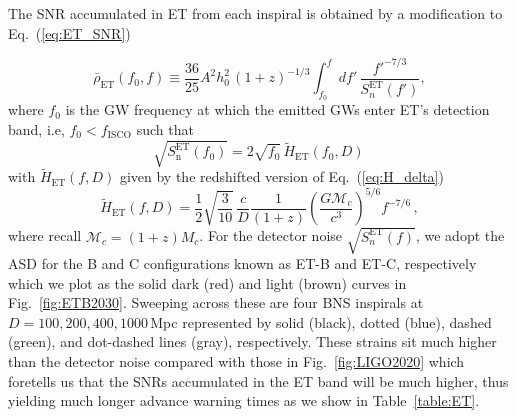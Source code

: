 \documentclass[amsmath,amssymb,aps,floats,amsfonts,notitlepage,superscriptaddress,eqsecnum,nofootinbib,10pt]{revtex4-1}
\newcommand{\f}{\frac}
\newcommand{\be}{\begin{equation}}
\newcommand{\ee}{\end{equation}}
\begin{document}
The SNR accumulated in ET from each inspiral is obtained by a modification to Eq.~(\ref{eq:ET_SNR})

%
\be
\bar\rho_{\text{ET}}(f_0,f)\equiv \f{36}{25}A^2 h_0^2\, (1+z)^{-1/3}\int_{f_0}^{f} d f'\, \f{f'^{-7/3}}{S^\text{ET}_n(f')} \label{eq:ET_SNRv2},
\ee
where $f_0$ is the GW frequency at which the emitted GWs enter ET's detection band, i.e, $f_0 < f_\text{ISCO}$ such that
%
 \be
 \sqrt{S^\text{ET}_\text{n}(f_0)} = 2\sqrt{f_0}\, \tilde{H}_\text{ET}(f_0, D) \label{eq:f0_ET}\,
 \ee
with $\tilde{H}_\text{ET}(f, D)$ given by the redshifted version of Eq.~(\ref{eq:H_delta})
%
\be
\tilde{H}_\text{ET}(f, D) = \f{1}{2}\sqrt{\f{3}{10}}\, \f{c}{D}\f{1}{(1+z)}\left(\f{G \mathcal{M}_c}{c^3}\right)^{5/6} f^{-7/6}\, , \label{eq:H_delta_redshifted}
\ee
%
where recall $\mathcal{M}_c = (1+z)M_c$.
For the detector noise $\sqrt{S^\text{ET}_n(f)}$, we adopt the ASD for the B and C configurations known as ET-B and ET-C, respectively \cite{Hild:2010id} which we plot as the solid dark (red) and light (brown) curves in Fig.~\ref{fig:ETB2030}.
Sweeping across these are four BNS inspirals at $D=100,200,400,1000\,$Mpc represented by solid (black), dotted (blue), dashed (green),
and dot-dashed lines (gray), respectively. These strains sit much higher than the detector noise
compared with those in Fig.~\ref{fig:LIGO2020} which foretells us that the SNRs accumulated in the ET band will be much higher, 
thus yielding much longer advance warning times as we show in Table~\ref{table:ET}.
\end{document}
